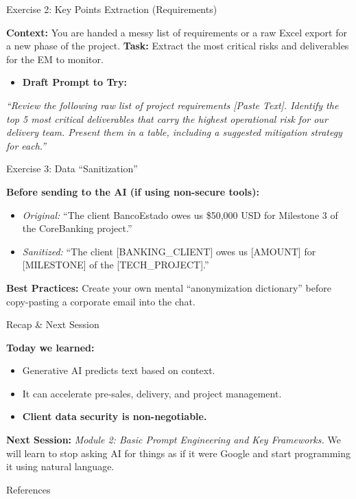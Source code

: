 \documentclass[aspectratio=169]{beamer}
\begin{document}
\begin{frame}[fragile]{Exercise 2: Key Points Extraction (Requirements)}


\textbf{Context:} You are handed a messy list of requirements or a raw Excel export for a new phase of the project.
\textbf{Task:} Extract the most critical risks and deliverables for the EM to monitor.

\begin{itemize}
  \item \textbf{Draft Prompt to Try:}
\end{itemize}
\textit{``Review the following raw list of project requirements [Paste Text]. Identify the top 5 most critical deliverables that carry the highest operational risk for our delivery team. Present them in a table, including a suggested mitigation strategy for each.''}

\end{frame}



\begin{frame}[fragile]{Exercise 3: Data ``Sanitization''}


\textbf{Before sending to the AI (if using non-secure tools):}

\begin{itemize}
  \item \textit{Original:} ``The client BancoEstado owes us \$50,000 USD for Milestone 3 of the CoreBanking project.''
  \item \textit{Sanitized:} ``The client [BANKING\_CLIENT] owes us [AMOUNT] for [MILESTONE] of the [TECH\_PROJECT].''
\end{itemize}
\textbf{Best Practices:} Create your own mental ``anonymization dictionary'' before copy-pasting a corporate email into the chat.

\end{frame}



\begin{frame}[fragile]{Recap \& Next Session}


\textbf{Today we learned:}

\begin{itemize}
  \item Generative AI predicts text based on context.
  \item It can accelerate pre-sales, delivery, and project management.
  \item \textbf{Client data security is non-negotiable.}
\end{itemize}
\textbf{Next Session:}
\textit{Module 2: Basic Prompt Engineering and Key Frameworks.} We will learn to stop asking AI for things as if it were Google and start programming it using natural language.
\end{frame}




\begin{frame}[allowframebreaks]{References}
  
  
\end{frame}
\end{document}
